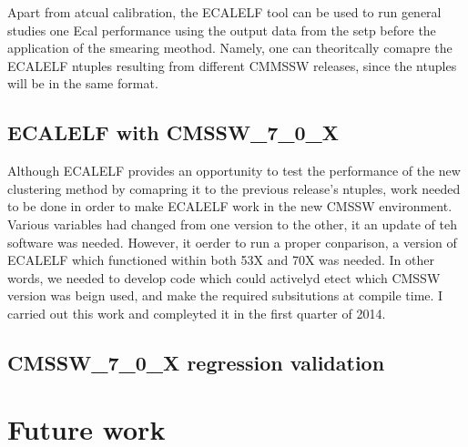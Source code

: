 \documentclass[10pt]{article}
\begin{document}
Apart from atcual calibration, the ECALELF tool can be used to run general studies one Ecal performance using the output data from the setp before the application of the smearing meothod. Namely, one can  theoritcally comapre the ECALELF ntuples resulting from different CMMSSW releases, since the ntuples will be in the same format.

\subsection{ECALELF with CMSSW\_7\_0\_X}

Although ECALELF provides an opportunity to test the performance of the new clustering method by comapring it to the previous release's ntuples, work needed to be done in order to make ECALELF work in the new CMSSW environment. Various variables had changed from one version to the other, it an update of teh software was needed. However, it oerder to run a proper conparison, a version of ECALELF which functioned within both 53X and 70X was needed. In other words, we needed to develop code which could activelyd etect which CMSSW version was beign used, and make the required subsitutions at compile time. I carried out this work and compleyted it in the first quarter of 2014.

\subsection{CMSSW\_7\_0\_X regression validation}

\newpage

\section{Future work}
\end{document}
